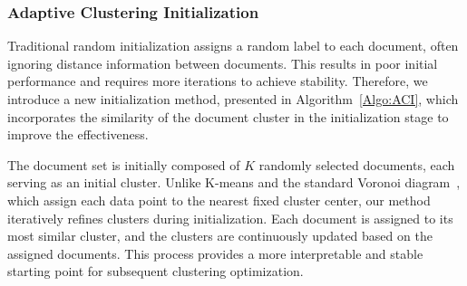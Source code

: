 

\subsubsection{Adaptive Clustering Initialization}
Traditional random initialization assigns a random label to each document, often ignoring distance information between documents. This results in poor initial performance and requires more iterations to achieve stability. Therefore, we introduce a new initialization method, presented in Algorithm~\ref{Algo:ACI}, which incorporates the similarity of the document cluster in the initialization stage to improve the effectiveness.


The document set is initially composed of $K$ randomly selected documents, each serving as an initial cluster. Unlike K-means and the standard Voronoi diagram~\cite{aurenhammer2000voronoi}, which assign each data point to the nearest fixed cluster center, our method iteratively refines clusters during initialization. Each document is assigned to its most similar cluster, and the clusters are continuously updated based on the assigned documents. This process provides a more interpretable and stable starting point for subsequent clustering optimization.


